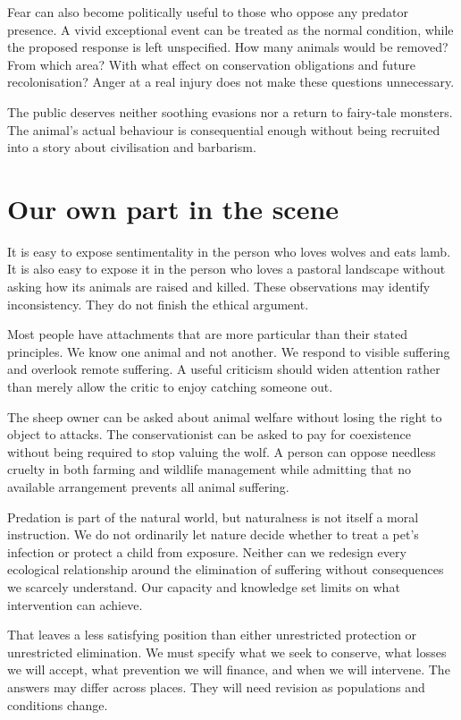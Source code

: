 \documentclass[12pt,a4paper]{book}
\begin{document}
Fear can also become politically useful to those who oppose any predator presence. A vivid exceptional event can be treated as the normal condition, while the proposed response is left unspecified. How many animals would be removed? From which area? With what effect on conservation obligations and future recolonisation? Anger at a real injury does not make these questions unnecessary.

The public deserves neither soothing evasions nor a return to fairy-tale monsters. The animal's actual behaviour is consequential enough without being recruited into a story about civilisation and barbarism.

\section*{Our own part in the scene}

It is easy to expose sentimentality in the person who loves wolves and eats lamb. It is also easy to expose it in the person who loves a pastoral landscape without asking how its animals are raised and killed. These observations may identify inconsistency. They do not finish the ethical argument.

Most people have attachments that are more particular than their stated principles. We know one animal and not another. We respond to visible suffering and overlook remote suffering. A useful criticism should widen attention rather than merely allow the critic to enjoy catching someone out.

The sheep owner can be asked about animal welfare without losing the right to object to attacks. The conservationist can be asked to pay for coexistence without being required to stop valuing the wolf. A person can oppose needless cruelty in both farming and wildlife management while admitting that no available arrangement prevents all animal suffering.

Predation is part of the natural world, but naturalness is not itself a moral instruction. We do not ordinarily let nature decide whether to treat a pet's infection or protect a child from exposure. Neither can we redesign every ecological relationship around the elimination of suffering without consequences we scarcely understand. Our capacity and knowledge set limits on what intervention can achieve.

That leaves a less satisfying position than either unrestricted protection or unrestricted elimination. We must specify what we seek to conserve, what losses we will accept, what prevention we will finance, and when we will intervene. The answers may differ across places. They will need revision as populations and conditions change.
\end{document}

